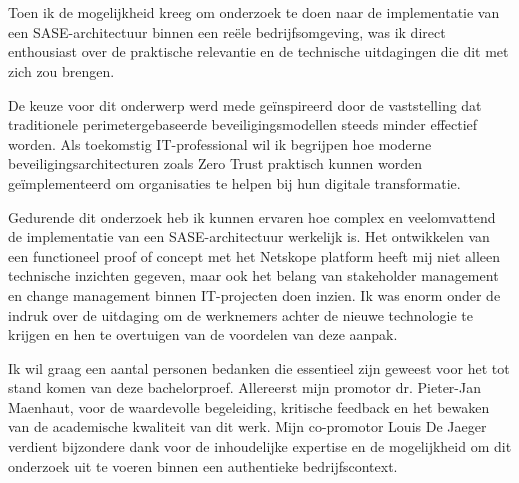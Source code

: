 
\chapter*{}%
\label{ch:voorwoord}


Toen ik de mogelijkheid kreeg om onderzoek te doen naar de implementatie van een SASE-architectuur binnen een reële bedrijfsomgeving, was ik direct enthousiast over de praktische relevantie en de technische uitdagingen die dit met zich zou brengen.

\vspace{2ex}

De keuze voor dit onderwerp werd mede geïnspireerd door de vaststelling dat traditionele perimetergebaseerde beveiligingsmodellen steeds minder effectief worden. Als toekomstig IT-professional wil ik begrijpen hoe moderne beveiligingsarchitecturen zoals Zero Trust praktisch kunnen worden geïmplementeerd om organisaties te helpen bij hun digitale transformatie.

\vspace{2ex}

Gedurende dit onderzoek heb ik kunnen ervaren hoe complex en veelomvattend de implementatie van een SASE-architectuur werkelijk is. Het ontwikkelen van een functioneel proof of concept met het Netskope platform heeft mij niet alleen technische inzichten gegeven, maar ook het belang van stakeholder management en change management binnen IT-projecten doen inzien. Ik was enorm onder de indruk over de uitdaging om de werknemers achter de nieuwe technologie te krijgen en hen te overtuigen van de voordelen van deze aanpak.

\vspace{2ex}

Ik wil graag een aantal personen bedanken die essentieel zijn geweest voor het tot stand komen van deze bachelorproef. Allereerst mijn promotor dr. Pieter-Jan Maenhaut, voor de waardevolle begeleiding, kritische feedback en het bewaken van de academische kwaliteit van dit werk. Mijn co-promotor Louis De Jaeger verdient bijzondere dank voor de inhoudelijke expertise en de mogelijkheid om dit onderzoek uit te voeren binnen een authentieke bedrijfscontext.

